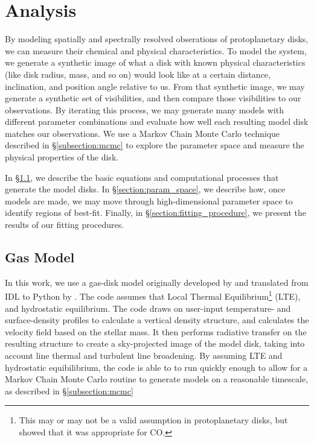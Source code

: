 \chapter{Analysis}
\label{chap:analysis}

By modeling spatially and spectrally resolved obserations of protoplanetary disks, we can measure their chemical and physical characteristics. To model the system, we generate a synthetic image of what a disk with known physical characteristics (like disk radius, mass, and so on) would look like at a certain distance, inclination, and position angle relative to us. From that synthetic image, we may generate a synthetic set of visibilities, and then compare those visibilities to our observations. By iterating this process, we may generate many models with different parameter combinations and evaluate how well each resulting model disk matches our observations. We use a Markov Chain Monte Carlo technique described in \S\ref{subsection:mcmc} to explore the parameter space and measure the physical properties of the disk.


In \S\ref{section:gas_model}, we describe the basic equations and computational processes that generate the model disks. In \S\ref{section:param_space}, we describe how, once models are made, we may move through high-dimensional parameter space to identify regions of best-fit. Finally, in \S\ref{section:fitting_procedure}, we present the results of our fitting procedures.


\section{Gas Model}
\label{section:gas_model}

In this work, we use a gas-disk model originally developed by \citep{Rosenfeld2012,Rosenfeld2013} and translated from IDL to Python by \cite{Flaherty2015}. The code assumes that Local Thermal Equilibrium\footnote{This may or may not be a valid assumption in protoplanetary disks, but \cite{Pavlyuchenkov2007} showed that it was appropriate for CO.} (LTE), and hydrostatic equilibrium. The code draws on user-input temperature- and surface-density profiles to calculate a vertical density structure, and calculates the velocity field based on the stellar mass. It then performs radiative transfer on the resulting structure to create a sky-projected image of the model disk, taking into account line thermal and turbulent line broadening. By assuming LTE and hydrostatic equibilibrium, the code is able to to run quickly enough to allow for a Markov Chain Monte Carlo routine to generate models on a reasonable timescale, as described in \S\ref{subsection:mcmc}




